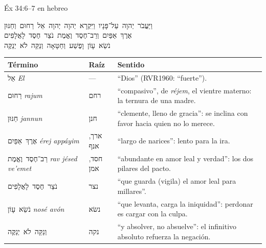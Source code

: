 \documentclass[hyperref={bookmarks=false},aspectratio=169]{beamer}
\newcommand{\heb}[1]{\mbox{\foreignlanguage{hebrew}{#1}}}
\begin{document}
\begin{frame}{Éx 34:6--7 en hebreo}
\begin{center}
\heb{וַיַּעֲבֹר יְהוָה עַל־פָּנָיו וַיִּקְרָא יְהוָה יְהוָה אֵל רַחוּם וְחַנּוּן}\\[2pt]
\heb{אֶרֶךְ אַפַּיִם וְרַב־חֶסֶד וֶאֱמֶת נֹצֵר חֶסֶד לָאֲלָפִים}\\[2pt]
\heb{נֹשֵׂא עָוֹן וָפֶשַׁע וְחַטָּאָה וְנַקֵּה לֹא יְנַקֶּה}
\end{center}
\renewcommand{\arraystretch}{1.12}\scriptsize
\begin{tabular}{@{}>{\RaggedRight\arraybackslash}p{2.7cm}>{\RaggedRight\arraybackslash}p{1.2cm}>{\RaggedRight\arraybackslash}p{7.9cm}@{}}
\toprule
\textbf{Término} & \textbf{Raíz} & \textbf{Sentido} \\ \midrule
\heb{אֵל} \emph{El} & --- & ``Dios'' (RVR1960: ``fuerte''). \\
\heb{רַחוּם} \emph{rajum} & \heb{רחם} & ``compasivo'', de \emph{réjem}, el vientre materno: la ternura de una madre. \\
\heb{חַנּוּן} \emph{jannun} & \heb{חנן} & ``clemente, lleno de gracia'': se inclina con favor hacia quien no lo merece. \\
\heb{אֶרֶךְ אַפַּיִם} \emph{érej appáyim} & \heb{ארך}, \heb{אנף} & ``largo de narices'': lento para la ira. \\
\heb{רַב־חֶסֶד וֶאֱמֶת} \emph{rav jésed ve'emet} & \heb{חסד}, \heb{אמן} & ``abundante en amor leal y verdad'': los dos pilares del pacto. \\
\heb{נֹצֵר חֶסֶד לָאֲלָפִים} & \heb{נצר} & ``que guarda (vigila) el amor leal para millares''. \\
\heb{נֹשֵׂא עָוֹן} \emph{nosé avón} & \heb{נשׂא} & ``que levanta, carga la iniquidad'': perdonar es cargar con la culpa. \\
\heb{וְנַקֵּה לֹא יְנַקֶּה} & \heb{נקה} & ``y absolver, no absuelve'': el infinitivo absoluto refuerza la negación. \\
\bottomrule
\end{tabular}
\end{frame}
\end{document}
